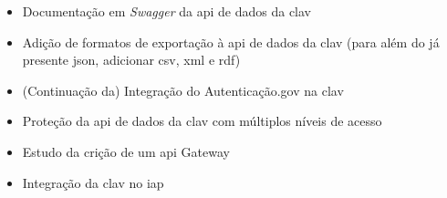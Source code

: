 \begin{itemize}
    \item Documentação em \textit{Swagger} da \acrshort{api} de dados da \acrshort{clav}
    \item Adição de formatos de exportação à \acrshort{api} de dados da \acrshort{clav} (para além do já presente \acrshort{json}, adicionar \acrshort{csv}, \acrshort{xml} e \acrshort{rdf})
    \item (Continuação da) Integração do Autenticação.gov na \acrshort{clav}
    \item Proteção da \acrshort{api} de dados da \acrshort{clav} com múltiplos níveis de acesso
    \item Estudo da crição de um \acrshort{api} Gateway
    \item Integração da \acrshort{clav} no \acrshort{iap}
\end{itemize}

